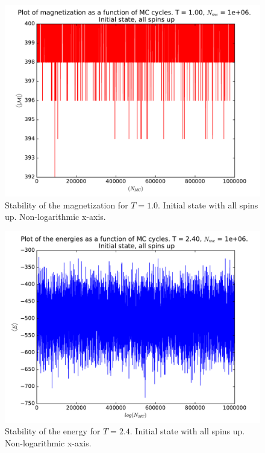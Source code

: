 \documentclass[12pt]{article}
\begin{document}
\begin{figure}[H]
\centering
\includegraphics[width=\linewidth]{Plots/Magnetization_stability_UpInitSpin_T1.pdf}
\caption{Stability of the magnetization for $T=1.0$. Initial state with all spins up. Non-logarithmic x-axis.}
\end{figure}

\begin{figure}[H]
\centering
\includegraphics[width=\linewidth]{Plots/Energy_stability_UpInitSpin_T24.pdf}
\caption{Stability of the energy for $T=2.4$. Initial state with all spins up. Non-logarithmic x-axis.}
\end{figure}
\end{document}
